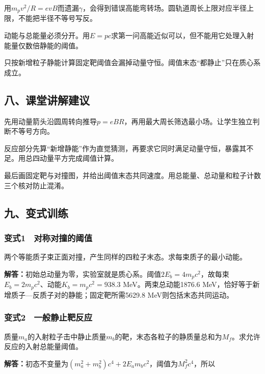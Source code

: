 \documentclass[12pt,a4paper,fontset=fandol]{ctexart}
\begin{document}
用\(m_pv^2/R=evB\)而遗漏\(\gamma\)，会得到错误高能弯转场。圆轨道周长上限对应半径上限，不能把半径不等号写反。

动能与总能量必须分开。用\(E=pc\)求第一问高能近似可以，但不能用它处理入射能量仅数倍静能的阈值。

只按新增粒子静能计算固定靶阈值会漏掉动量守恒。阈值末态``都静止''只在质心系成立。

\subsection{八、课堂讲解建议}\label{ux516bux8bfeux5802ux8bb2ux89e3ux5efaux8bae-3}

先用动量箭头沿圆周转向推导\(p=eBR\)，再用最大周长筛选最小场。让学生独立判断不等号方向。

反应部分先算``新增静能''作为直觉猜测，再要求它同时满足动量守恒，暴露其不足。用总四动量平方完成阈值计算。

最后画固定靶与对撞图，并给出阈值末态共同速度。用总能量、总动量和粒子计数三个核对防止混淆。

\subsection{九、变式训练}\label{ux4e5dux53d8ux5f0fux8badux7ec3-3}

\subsubsection{变式1　对称对撞的阈值}\label{ux53d8ux5f0f1-ux5bf9ux79f0ux5bf9ux649eux7684ux9608ux503c}

两个等能质子束正面对撞，产生同样的四粒子末态。求每束质子的最小动能。

\textbf{解答：}初始总动量为零，实验室就是质心系。阈值\(2E_b=4m_pc^2\)，故每束\(E_b=2m_pc^2\)、动能\(K_b=m_pc^2=938.3\)
MeV。两束总动能1876.6
MeV，恰好等于新增质子---反质子对的静能；固定靶所需5629.8
MeV则包括末态共同运动。

\subsubsection{变式2　一般静止靶反应}\label{ux53d8ux5f0f2-ux4e00ux822cux9759ux6b62ux9776ux53cdux5e94}

质量\(m_a\)的入射粒子击中静止质量\(m_b\)的靶，末态各粒子的静质量总和为\(M_f\)。求允许反应的入射总能量阈值。

\textbf{解答：}初态不变量为\((m_a^2+m_b^2)c^4+2E_am_bc^2\)，阈值为\(M_f^2c^4\)，所以
\end{document}
